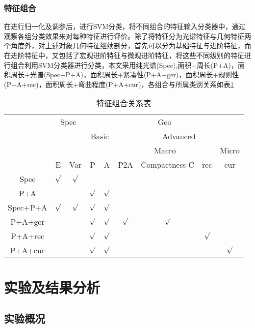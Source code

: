 \documentclass[supercite]{upcthesis}
\begin{document}
\subsubsection{特征组合}
在进行归一化及调参后，进行SVM分类，将不同组合的特征输入分类器中，通过观察各组分类效果来对每种特征进行评价。除了将特征分为光谱特征与几何特征两个角度外，对上述对象几何特征继续剖分，首先可以分为基础特征与进阶特征，而在进阶特征中，又包括了宏观进阶特征与微观进阶特征，将这些不同级别的特征进行组合利用SVM分类器进行分类，本文采用纯光谱(Spec),面积+周长(P+A)，面积周长+光谱(Spec+P+A)，面积周长+紧凑性(P+A+ger)，面积周长+规则性(P+A+rec)，面积周长+弯曲程度(P+A+cur)，各组合与所属类别关系如表\ref{feature_combine}
\begin{table}[htbp]
\small
\centering
\caption{特征组合关系表}
\begin{tabular}{ccccccccc}
	\toprule
	       & \multicolumn{2}{c}{Spec}& \multicolumn{6}{c}{Geo}\\ 
	       \cmidrule(lr){2-3} \cmidrule(lr){4-9}
	       &   &   & \multicolumn{2}{c}{Basic}&\multicolumn{4}{c}{Advanced}\\ 
	       \cmidrule(lr){4-5} \cmidrule(lr){6-9}
	       &   &   &   &   & \multicolumn{3}{c}{Macro}&Micro\\
	       \cmidrule(lr){6-8} \cmidrule(lr){9-9}
           & E &Var	&P &A &P2A &Compactness C &rec &cur \\ \midrule
	   Spec&$\surd$&$\surd$&   &   &   &    & &\\
	    P+A&	&		& $\surd$ & $\surd$   &   &  &    &\\
	Spec+P+A&$\surd$&$\surd$& $\surd$ & $\surd$   &   &  &    &\\
	P+A+ger&	&		& $\surd$ & $\surd$   &$\surd$&$\surd$&    &\\
	P+A+rec&	&		& $\surd$ & $\surd$   &   &  &$\surd$     &\\
	P+A+cur&	&		& $\surd$ & $\surd$   &   &  &    &$\surd$ \\ \bottomrule
\end{tabular}
\label{feature_combine}
\end{table}
\section{实验及结果分析}
\subsection{实验概况}
\end{document}
